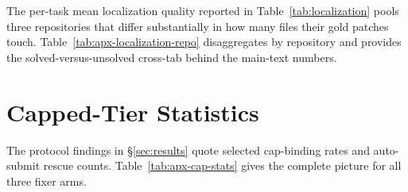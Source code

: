 The per-task mean localization quality reported in Table~\ref{tab:localization}
pools three repositories that differ substantially in how many files their
gold patches touch.  Table~\ref{tab:apx-localization-repo} disaggregates by
repository and provides the solved-versus-unsolved cross-tab behind the
main-text numbers.

\begin{table}[H]
\centering
\footnotesize
\caption{\textbf{Localization by repository, and against outcome.}
\emph{Top:} \modelname's file-localization quality per repository; spread
tracks the number of gold files per task.  \emph{Bottom:} quality split
by whether the system solved the task.  Better localization correlates
weakly with solving ($+0.024$ recall), so localization is not a gate on
the outcome.}
\label{tab:apx-localization-repo}

\end{table}



\section{Capped-Tier Statistics}
\label{apx:cap-stats}

The protocol findings in \S\ref{sec:results} quote selected cap-binding
rates and auto-submit rescue counts.  Table~\ref{tab:apx-cap-stats} gives
the complete picture for all three fixer arms.

\begin{table}[H]
\centering
\footnotesize
\caption{\textbf{How often the evaluation caps bound, and what
auto-submission was worth.}  All arms ran the official capped tier ($50$
turns, \$2.00 per attempt).  The turn cap is the binding constraint; the
cost cap bound only five times.  Auto-submission rescued $24$ of
\fxopus's solves and $33$ of \fxgpt's; without it, both anchors' rates
would fall roughly $9$--$13$ points.  The gold-patch control passes on
$265$ of $266$ tasks.}
\label{tab:apx-cap-stats}

\end{table}



